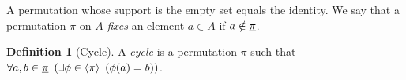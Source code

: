 \documentclass[a4paper,twoside,12pt,openany]{report}
\theoremstyle{plain}
\theoremstyle{definition}
\newtheorem{definition}{Definition}
\theoremstyle{remark}
\begin{document}
A permutation whose support is the empty set equals the identity. We say that a permutation \(\pi\) on \(A\) \textit{fixes} an element \(a\in A\) if \(a\notin\underline{\pi}\).



\begin{definition}[Cycle]
	A \emph{cycle} is a permutation \(\pi\) such that 
	\(\forall a,b\in \underline{\pi}\ \left(\exists \phi\in\langle\pi\rangle\ \left(\phi(a)=b\right)\right)\).
	
\end{definition}
\end{document}
